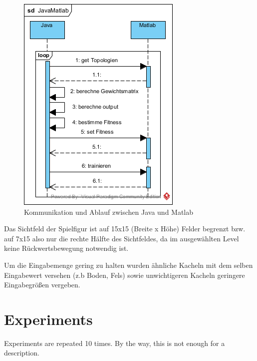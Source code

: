 \documentclass{hbrs-ecta-report}
\begin{document}
\begin{figure}[h!]
	\centering
	\includegraphics[width=\linewidth]{img/JavaMatlab.png}
	\caption{Kommunikation und Ablauf zwischen Java und Matlab}
	\label{fig:sequenzdiagramm} 
\end{figure}

Das Sichtfeld der Spielfigur ist auf 15x15 (Breite x Höhe) Felder begrenzt bzw. auf 7x15 also nur die rechte Hälfte des Sichtfeldes, da im ausgewählten Level keine Rückwertsbewegung notwendig ist.

Um die Eingabemenge gering zu halten wurden ähnliche Kacheln mit dem selben Eingabewert versehen (z.b Boden, Fels) sowie unwichtigeren Kacheln geringere Eingabegrößen vergeben.

\FloatBarrier
\section{Experiments}
Experiments are repeated 10 times. By the way, this is not enough for a description.
\end{document}
